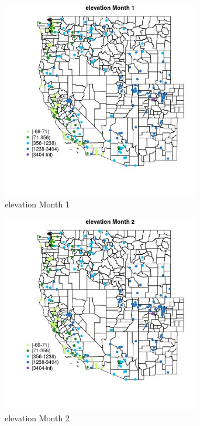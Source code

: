 \begin{figure} 
\centering  
\includegraphics[width=0.77\textwidth]{Code_Outputs/Report_ML_input_PM25_Step4_part_e_de_duplicated_aveswNAs_MapObsMo1elevation.jpg} 
\caption{\label{fig:Report_ML_input_PM25_Step4_part_e_de_duplicated_aveswNAsMapObsMo1elevation}elevation Month 1} 
\end{figure} 
 

\clearpage 

\begin{figure} 
\centering  
\includegraphics[width=0.77\textwidth]{Code_Outputs/Report_ML_input_PM25_Step4_part_e_de_duplicated_aveswNAs_MapObsMo2elevation.jpg} 
\caption{\label{fig:Report_ML_input_PM25_Step4_part_e_de_duplicated_aveswNAsMapObsMo2elevation}elevation Month 2} 
\end{figure} 
 

